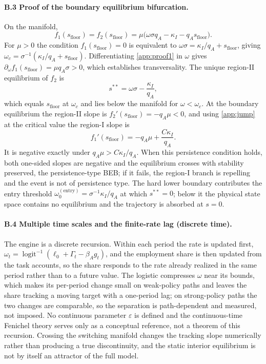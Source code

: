 \documentclass[review,12pt]{elsarticle}
\theoremstyle{plain}
\theoremstyle{definition}
\theoremstyle{remark}
\begin{document}
\paragraph{B.3 Proof of the boundary equilibrium bifurcation.}
On the manifold,
\begin{equation}
f_1(s_{\text{floor}})=f_2(s_{\text{floor}})
=\mu\bigl(\omega\sigma q_A-\kappa_I-q_A s_{\text{floor}}\bigr).
\label{app:proof1}
\end{equation}
For $\mu>0$ the condition $f_1(s_{\text{floor}})=0$ is equivalent to
$\omega\sigma=\kappa_I/q_A+s_{\text{floor}}$, giving
$\omega_c=\sigma^{-1}(\kappa_I/q_A+s_{\text{floor}})$. Differentiating
\eqref{app:proof1} in $\omega$ gives $\partial_\omega f_1(s_{\text{floor}})
=\mu q_A\sigma>0$, which establishes transversality. The unique region-II
equilibrium of $f_2$ is
\begin{equation*}
s^{**}=\omega\sigma-\frac{\kappa_I}{q_A},
\end{equation*}
which equals $s_{\text{floor}}$ at $\omega_c$ and lies below the manifold for
$\omega<\omega_c$. At the boundary equilibrium the region-II slope is
$f_2'(s_{\text{floor}})=-q_A\mu<0$, and using \eqref{app:jump} at the
critical value the region-I slope is
\begin{equation*}
f_1'(s_{\text{floor}})=-q_A\mu+\frac{C\kappa_I}{q_A}.
\end{equation*}
It is negative exactly under $q_A\mu>C\kappa_I/q_A$. When this persistence
condition holds, both one-sided slopes are negative and the equilibrium crosses
with stability preserved, the persistence-type BEB; if it fails, the region-I
branch is repelling and the event is not of persistence type. The hard lower
boundary contributes the entry threshold
$\omega_0^{(\text{entry})}=\sigma^{-1}\kappa_I/q_A$ at which $s^{**}=0$;
below it the physical state space contains no equilibrium and the trajectory
is absorbed at $s=0$.

\paragraph{B.4 Multiple time scales and the finite-rate lag (discrete time).}
The engine is a discrete recursion. Within each period the rate is updated first,
$\omega_t=\operatorname{logit}^{-1}(\ell_0+\Gamma_t-\beta_A g_t)$, and the
employment share is then updated from the task accounts, so the share responds to
the rate already realized in the same period rather than to a future value. The
logistic compresses $\omega$ near its bounds, which makes its per-period change
small on weak-policy paths and leaves the share tracking a moving target with a
one-period lag; on strong-policy paths the two changes are comparable, so the
separation is path-dependent and measured, not imposed. No continuous parameter
$\varepsilon$ is defined and the continuous-time Fenichel theory serves only as
a conceptual reference, not a theorem of this recursion. Crossing the
switching manifold changes the tracking slope numerically rather than producing a true discontinuity, and the static
interior equilibrium is not by itself an attractor of the full model.
\end{document}
